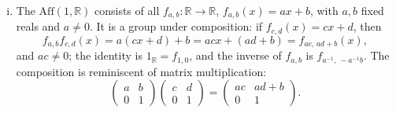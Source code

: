 \begin{eg}
\begin{enumerate}[(i)]
		      \(A = \begin{psmallmatrix} \cos\alpha & -\sin\alpha \\
				      \sin\alpha & \cos\alpha \end{psmallmatrix}\), form the \(2 \times 2\)
		       \(SO(2,\mathbb{R})\). Indeed
		      \[
			      \begin{pmatrix} \cos\alpha & -\sin\alpha \\ \sin\alpha & \cos\alpha \end{pmatrix}
			      \begin{pmatrix} \cos\beta  & -\sin\beta  \\ \sin\beta  & \cos\beta  \end{pmatrix}
			      =
			      \begin{pmatrix} \cos(\alpha+\beta) & -\sin(\alpha+\beta) \\
				      \sin(\alpha+\beta) & \cos(\alpha+\beta) \end{pmatrix}
		      \]
		      by the addition theorems for sine and cosine; this calculation also shows that
		      \(SO(2,\mathbb{R})\) is abelian. The identity matrix is special orthogonal, and
		      so is the inverse of a special orthogonal matrix. We shall see that
		      \(SO(2,\mathbb{R})\) is a disguised version of the circle group \(S^1\), and
		      that it consists of all rotations of the plane about the origin.
		\item The  \(\mathrm{Aff}(1,\mathbb{R})\) consists of all
		       \(f_{a,b}\colon \mathbb{R}\to\mathbb{R}\),
		      \(f_{a,b}(x) = ax + b\), with \(a, b\) fixed reals and \(a \neq 0\). It is a
		      group under composition: if \(f_{c,d}(x) = cx+d\), then
		      \[
			      f_{a,b}f_{c,d}(x) = a(cx+d) + b = acx + (ad+b) = f_{ac,\,ad+b}(x),
		      \]
		      and \(ac \neq 0\); the identity is \(1_{\mathbb{R}} = f_{1,0}\), and the
		      inverse of \(f_{a,b}\) is \(f_{a^{-1},\,-a^{-1}b}\). The composition is
		      reminiscent of matrix multiplication:
		      \[
			      \begin{pmatrix} a & b \\ 0 & 1 \end{pmatrix}
			      \begin{pmatrix} c & d \\ 0 & 1 \end{pmatrix}
			      =
			      \begin{pmatrix} ac & ad+b \\ 0 & 1 \end{pmatrix}.
		      \]
	\end{enumerate}
\end{eg}

